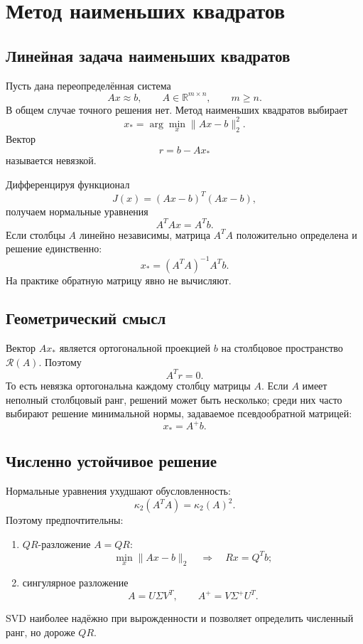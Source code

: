 \section{Метод наименьших квадратов}
\label{sec:least-squares}

\subsection{Линейная задача наименьших квадратов}

Пусть дана переопределённая система
\[
    Ax\approx b,
    \qquad A\in\mathbb R^{m\times n},
    \qquad m\geq n.
\]
В общем случае точного решения нет. Метод наименьших квадратов выбирает
\[
    x_* = \arg\min_x \|Ax-b\|_2^2.
\]
Вектор
\[
    r=b-Ax_*
\]
называется невязкой.

Дифференцируя функционал
\[
    J(x)=(Ax-b)^T(Ax-b),
\]
получаем нормальные уравнения
\[
    A^TAx=A^Tb.
\]
Если столбцы $A$ линейно независимы, матрица $A^TA$ положительно определена и
решение единственно:
\[
    x_*=(A^TA)^{-1}A^Tb.
\]
На практике обратную матрицу явно не вычисляют.

\subsection{Геометрический смысл}

Вектор $Ax_*$ является ортогональной проекцией $b$ на столбцовое пространство
$\mathcal R(A)$. Поэтому
\[
    A^Tr=0.
\]
То есть невязка ортогональна каждому столбцу матрицы $A$. Если $A$ имеет
неполный столбцовый ранг, решений может быть несколько; среди них часто выбирают
решение минимальной нормы, задаваемое псевдообратной матрицей:
\[
    x_*=A^+b.
\]

\subsection{Численно устойчивое решение}

Нормальные уравнения ухудшают обусловленность:
\[
    \kappa_2(A^TA)=\kappa_2(A)^2.
\]
Поэтому предпочтительны:
\begin{enumerate}
    \item $QR$-разложение $A=QR$:
    \[
        \min_x\|Ax-b\|_2
        \quad\Longrightarrow\quad
        Rx=Q^Tb;
    \]
    \item сингулярное разложение
    \[
        A=U\Sigma V^T,
        \qquad
        A^+=V\Sigma^+U^T.
    \]
\end{enumerate}
SVD наиболее надёжно при вырожденности и позволяет определить численный ранг,
но дороже $QR$.

